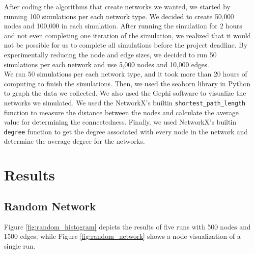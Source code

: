 \documentclass[journal]{IEEEtran}
\begin{document}
\noindent After coding the algorithms that create networks we wanted, we started by running 100 simulations per each network type. We decided to create 50,000 nodes and 100,000 in each simulation. After running the simulation for 2 hours and not even completing one iteration of the simulation, we realized that it would not be possible for us to complete all simulations before the project deadline. By experimentally reducing the node and edge sizes, we decided to run 50 simulations per each network and use 5,000 nodes and 10,000 edges. \\

\noindent We ran 50 simulations per each network type, and it took more than 20 hours of computing to finish the simulations. Then, we used the seaborn library in Python to graph the data we collected. We also used the Gephi software to visualize the networks we simulated. We used the NetworkX's builtin \texttt{shortest\_path\_length} function to measure the distance between the nodes and calculate the average value for determining the connectedness. Finally, we used NetworkX's builtin \texttt{degree} function to get the degree associated with every node in the network and determine the average degree for the networks.


\newpage
\section{Results}
\subsection{Random Network}
\noindent Figure \ref{fig:random_histogram} depicts the results of five runs with 500 nodes and 1500 edges, while Figure \ref{fig:random_network} shows a node visualization of a single run.   
\end{document}
